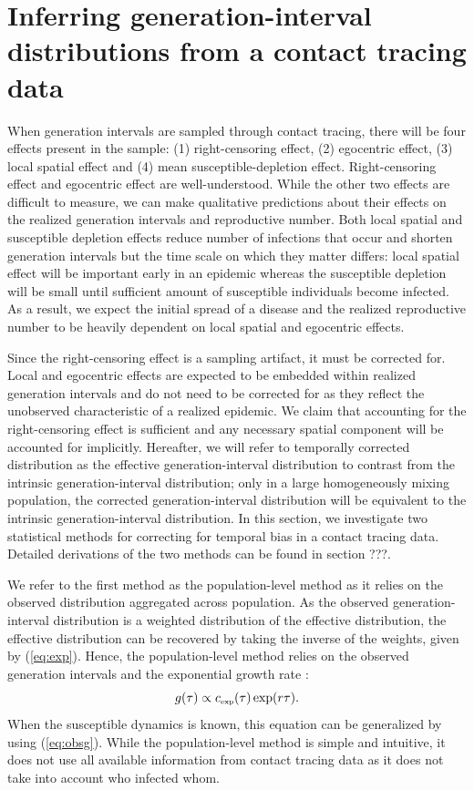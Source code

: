 \documentclass[12pt]{article}
\newcommand{\eref}[1]{(\ref{eq:#1})}
\newcommand{\tsub}[2]{#1_{{\textrm{\tiny #2}}}}
\begin{document}
\section{Inferring generation-interval distributions from a contact tracing data}

When generation intervals are sampled through contact tracing, there will be four effects present in the sample: (1) right-censoring effect, (2) egocentric effect, (3) local spatial effect and (4) mean susceptible-depletion effect.
Right-censoring effect and egocentric effect are well-understood.
While the other two effects are difficult to measure, we can make qualitative predictions about their effects on the realized generation intervals and reproductive number. 
Both local spatial and susceptible depletion effects reduce number of infections that occur and shorten generation intervals but the time scale on which they matter differs:
local spatial effect will be important early in an epidemic whereas the susceptible depletion will be small until sufficient amount of susceptible individuals become infected.
As a result, we expect the initial spread of a disease and the realized reproductive number to be heavily dependent on local spatial and egocentric effects.

Since the right-censoring effect is a sampling artifact, it must be corrected for.
Local and egocentric effects are expected to be embedded within realized generation intervals and do not need to be corrected for as they reflect the unobserved characteristic of a realized epidemic.
We claim that accounting for the right-censoring effect is sufficient and any necessary spatial component will be accounted for implicitly.
Hereafter, we will refer to temporally corrected distribution as the effective generation-interval distribution to contrast from the intrinsic generation-interval distribution; only in a large homogeneously mixing population, the corrected generation-interval distribution will be equivalent to the intrinsic generation-interval distribution.
In this section, we investigate two statistical methods for correcting for temporal bias in a contact tracing data.
Detailed derivations of the two methods can be found in section ???.

We refer to the first method as the population-level method as it relies on the observed distribution aggregated across population.
As the observed generation-interval distribution is a weighted distribution of the effective distribution, the effective distribution can be recovered by taking the inverse of the weights, given by \eref{exp}.
Hence, the population-level method relies on the observed generation intervals and the exponential growth rate \citep{tomba2010some, nishiura2010time}:
\begin{equation}
g(\tau) \propto \tsub{c}{exp}(\tau) \exp(r\tau).
\end{equation}
When the susceptible dynamics is known, this equation can be generalized by using \eref{obsg}.
While the population-level method is simple and intuitive, it does not use all available information from contact tracing data as it does not take into account who infected whom.
\end{document}
